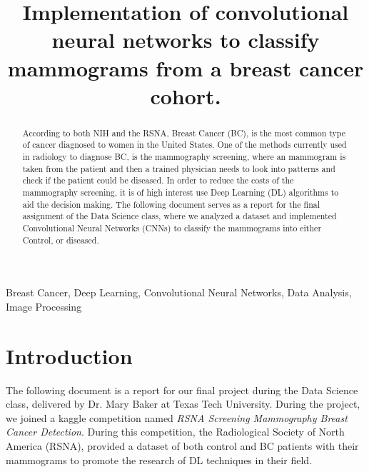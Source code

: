 \documentclass[conference]{IEEEtran}
\begin{document}
\title{Implementation of convolutional neural networks to classify mammograms from a breast cancer cohort.}

\author{
\and
{}
}

\maketitle

\begin{abstract}
According to both NIH and the RSNA, Breast Cancer (BC), is the most common type of cancer diagnosed to women in the United States. One of the methods currently used in radiology to diagnose BC, is the mammography screening, where an mammogram is taken from the patient and then a trained physician needs to look into patterns and check if the patient could be diseased. In order to reduce the costs of the mammography screening, it is of high interest use Deep Learning (DL) algorithms to aid the decision making. The following document serves as a report for the final assignment of the Data Science class, where we analyzed a dataset and implemented Convolutional Neural Networks (CNNs) to classify the mammograms into either Control, or diseased. 
\end{abstract}

\begin{IEEEkeywords}
Breast Cancer, Deep Learning, Convolutional Neural Networks, Data Analysis, Image Processing
\end{IEEEkeywords}

\section{Introduction}

The following document is a report for our final project during the Data Science class, delivered by Dr. Mary Baker at Texas Tech University. During the project, we joined a kaggle competition named \textit{RSNA Screening Mammography Breast Cancer Detection}. During this competition, the Radiological Society of North America (RSNA), provided a dataset of both control and BC patients with their mammograms to promote the research of DL techniques in their field. 
\end{document}
